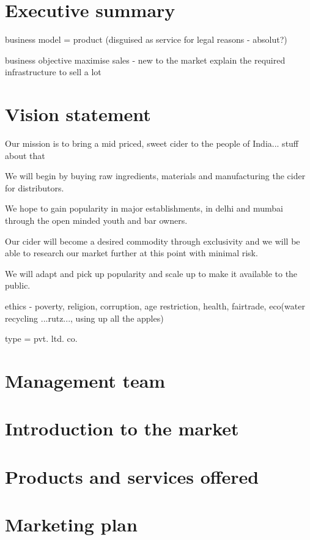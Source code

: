 \documentclass{article}
\begin{document}

\section{Executive summary}

business model = product (disguised as service for legal reasons - absolut?)

business objective 
maximise sales 
 - new to the market
   explain the required infrastructure to sell a lot 

\section{Vision statement}

Our mission is to bring a mid priced, sweet cider to the people of India... stuff
about that 

We will begin by buying raw ingredients, materials and manufacturing the cider
for distributors. 

We hope to gain popularity in major establishments, in delhi and mumbai through 
the open minded youth and bar owners.

Our cider will become a desired commodity through exclusivity and we will be
able to research our market further at this point with minimal risk.

We will adapt and pick up popularity and scale up to make it available to the
public. 

ethics - poverty, religion, corruption, age restriction, health, fairtrade,
eco(water recycling ...rutz..., using up all the apples)

type = pvt. ltd. co.

\section{Management team}

\section{Introduction to the market}
\section{Products and services offered}
\section{Marketing plan}
\end{document}
